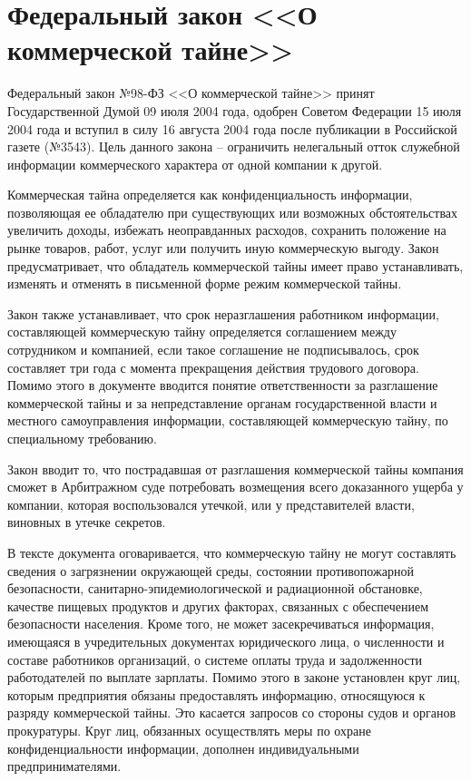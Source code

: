 \section{Федеральный закон <<О коммерческой тайне>>} \label{rights_98}

Федеральный закон №98-ФЗ <<О коммерческой тайне>> принят Государственной Думой 09 июля 2004 года, одобрен Советом Федерации 15 июля 2004 года и вступил в силу 16 августа 2004 года после публикации в Российской газете (№3543).
Цель данного закона -- ограничить нелегальный отток служебной информации коммерческого характера от одной компании к другой.

\vspace{\baselineskip}
Коммерческая тайна определяется как конфиденциальность информации, позволяющая ее обладателю при существующих или возможных обстоятельствах увеличить доходы, избежать неоправданных расходов, сохранить положение на рынке товаров, работ, услуг или получить иную коммерческую выгоду.
Закон предусматривает, что обладатель коммерческой тайны имеет право устанавливать, изменять и отменять в письменной форме режим коммерческой тайны.

Закон также устанавливает, что срок неразглашения работником информации, составляющей коммерческую тайну определяется соглашением между сотрудником и компанией, если такое соглашение не подписывалось, срок составляет три года с момента прекращения действия трудового договора. Помимо этого в документе вводится понятие ответственности за разглашение коммерческой тайны и за непредставление органам государственной власти и местного самоуправления информации, составляющей коммерческую тайну, по специальному требованию.

\vspace{\baselineskip}
Закон вводит то, что пострадавшая от разглашения коммерческой тайны компания сможет в Арбитражном суде потребовать возмещения всего доказанного ущерба у компании, которая воспользовался утечкой, или у представителей власти, виновных в утечке секретов.

\vspace{\baselineskip}
В тексте документа оговаривается, что коммерческую тайну не могут составлять сведения о загрязнении окружающей среды, состоянии противопожарной безопасности, санитарно-эпидемиологической и радиационной обстановке, качестве пищевых продуктов и других факторах, связанных с обеспечением безопасности населения. Кроме того, не может засекречиваться информация, имеющаяся в учредительных документах юридического лица, о численности и составе работников организаций, о системе оплаты труда и задолженности работодателей по выплате зарплаты. Помимо этого в законе установлен круг лиц, которым предприятия обязаны предоставлять информацию, относящуюся к разряду коммерческой тайны. Это касается запросов со стороны судов и органов прокуратуры. Круг лиц, обязанных осуществлять меры по охране конфиденциальности информации, дополнен индивидуальными предпринимателями.

